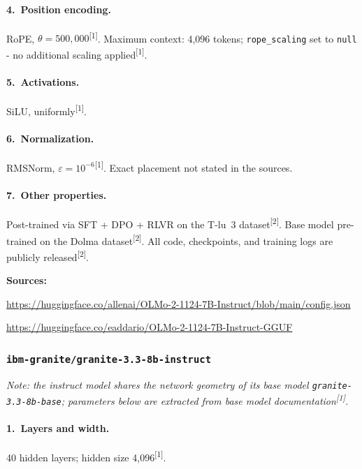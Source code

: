 \documentclass[11pt, a4paper]{article}
\newcommand{\src}[1]{\textsuperscript{\normalfont\small[#1]}}
\begin{document}
\paragraph{4.~Position encoding.}
RoPE, $\theta=500{,}000$\src{1}.
Maximum context: 4,096 tokens; \texttt{rope\_scaling} set to \texttt{null} -
no additional scaling applied\src{1}.

\paragraph{5.~Activations.}
SiLU, uniformly\src{1}.

\paragraph{6.~Normalization.}
RMSNorm, $\varepsilon=10^{-6}$\src{1}.
Exact placement not stated in the sources.

\paragraph{7.~Other properties.}
Post-trained via SFT + DPO + RLVR on the T-lu~3 dataset\src{2}.
Base model pre-trained on the Dolma dataset\src{2}.
All code, checkpoints, and training logs are publicly released\src{2}.

\noindent\textbf{Sources:}
\begin{enumerate}[noitemsep,label=\small{[\arabic*]},leftmargin=*,topsep=2pt]
\item \small\url{https://huggingface.co/allenai/OLMo-2-1124-7B-Instruct/blob/main/config.json}
\item \small\url{https://huggingface.co/eaddario/OLMo-2-1124-7B-Instruct-GGUF}
\end{enumerate}

\subsubsection{\texttt{ibm-granite/granite-3.3-8b-instruct}}

\noindent\textit{Note: the instruct model shares the network geometry of its base
model \texttt{granite-3.3-8b-base}; parameters below are extracted from base
model documentation\src{1}.}

\paragraph{1.~Layers and width.}
40 hidden layers; hidden size 4,096\src{1}.
\end{document}
